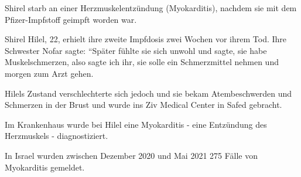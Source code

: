 Shirel starb an einer Herzmuskelentzündung (Myokarditis), nachdem sie mit dem
Pfizer-Impfstoff geimpft worden war.

Shirel Hilel, 22, erhielt ihre zweite Impfdosis zwei Wochen vor ihrem Tod. Ihre
Schwester Nofar sagte: ``Später fühlte sie sich unwohl und sagte, sie habe
Muskelschmerzen, also sagte ich ihr, sie solle ein Schmerzmittel nehmen und
morgen zum Arzt gehen.

Hilels Zustand verschlechterte sich jedoch und sie bekam Atembeschwerden und
Schmerzen in der Brust und wurde ins Ziv Medical Center in Safed gebracht.

Im Krankenhaus wurde bei Hilel eine Myokarditis - eine Entzündung des
Herzmuskels - diagnostiziert.

In Israel wurden zwischen Dezember 2020 und Mai 2021 275 Fälle von Myokarditis
gemeldet.
